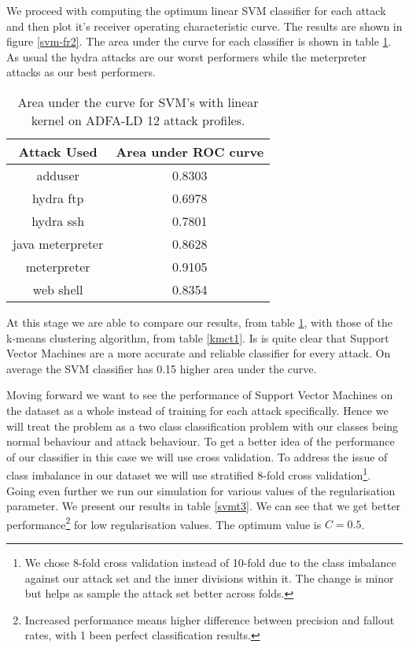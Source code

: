 \documentclass[reqno,openany,12pt]{amsbook}
\begin{document}
We proceed with computing the optimum linear SVM classifier for each attack and then plot it's receiver operating characteristic curve. The results are shown in figure \ref{svm-fr2}. The area under the curve for each classifier is shown in table \ref{svmt2}. As usual the hydra attacks are our worst performers while the meterpreter attacks as our best performers.

\begin{table}
\begin{tabular}{|c|c|}
\hline
Attack Used &  Area under ROC curve \\ \hline 
adduser          & 0.8303 \\ \hline
hydra ftp        & 0.6978 \\ \hline
hydra ssh        & 0.7801 \\ \hline
java meterpreter & 0.8628 \\ \hline
meterpreter      & 0.9105 \\ \hline
web shell        & 0.8354 \\ \hline
\end{tabular}
\vspace{5pt}
\caption{Area under the curve for SVM's with linear kernel on ADFA-LD 12 attack profiles.}
\label{svmt2}
\end{table}


At this stage we are able to compare our results, from table \ref{svmt2}, with those of the k-means clustering algorithm, from table \ref{kmct1}. Is is quite clear that Support Vector Machines are a more accurate and reliable classifier for every attack. On average the SVM classifier has 0.15 higher area under the curve.

Moving forward we want to see the performance of Support Vector Machines on the dataset as a whole instead of training for each attack specifically. Hence we will treat the problem as a two class classification problem with our classes being normal behaviour and attack behaviour. To get a better idea of the performance of our classifier in this case we will use cross validation. To address the issue of class imbalance in our dataset we will use stratified 8-fold cross validation\footnote{We chose 8-fold cross validation instead of 10-fold due to the class imbalance against our attack set and the inner divisions within it. The change is minor but helps as sample the attack set better across folds.}. Going even further we run our simulation for various values of the regularisation parameter. We present our results in table \ref{svmt3}. We can see that we get better performance\footnote{Increased performance means higher difference between precision and fallout rates, with 1 been perfect classification results.} for low regularisation values. The optimum value is $C=0.5$.
\end{document}
